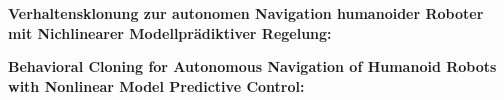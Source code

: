 \thispagestyle{empty}
\begin{center}
  \begin{minipage}[c][0.48\textheight][b]{0.9\textwidth}
    \small
    \textbf{
      Verhaltensklonung zur autonomen Navigation humanoider Roboter mit Nichlinearer Modellprädiktiver Regelung:
    }\par
    \vspace{\baselineskip}
    
  \end{minipage}\par
  \vfill
  \begin{minipage}[c][0.48\textheight][b]{0.9\textwidth}
    \small
    \textbf{
      Behavioral Cloning for Autonomous Navigation of Humanoid Robots with Nonlinear Model Predictive Control:
    }\par
    \vspace{\baselineskip}
    
  \end{minipage}
\end{center}
